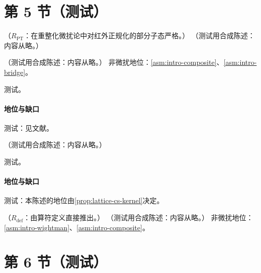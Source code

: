 \section{第 5 节（测试）}\label{sec:tmd-theorem}

\begin{proposition}\label{prop:tmd-evolution-oneloop}
（$R_{\mathrm{PT}}$：在重整化微扰论中对红外正规化的部分子态严格。）
（测试用合成陈述：内容从略。）
\end{proposition}

\begin{proposition}[小 $b$ 展开 \tagA]\label{prop:tmd-small-b}
（测试用合成陈述：内容从略。）
非微扰地位：\cref{asm:intro-composite}、\cref{asm:intro-bridge}。
\end{proposition}
\begin{proofsketch}测试。\end{proofsketch}
\paragraph{地位与缺口}测试：见文献。

\begin{proposition}\label{prop:tmd-css}
（测试用合成陈述：内容从略。）
\end{proposition}
\begin{proofsketch}测试。\end{proofsketch}
\paragraph{地位与缺口}测试：本陈述的地位由\cref{prop:lattice-cs-kernel}决定。

\begin{theorem}\label{thm:tmd-sivers-sign}
（$R_{\mathrm{def}}$：由算符定义直接推出。）
（测试用合成陈述：内容从略。）
非微扰地位：\cref{asm:intro-wightman}、\cref{asm:intro-composite}。
\end{theorem}

\section{第 6 节（测试）}\label{sec:tmd-evolution}

